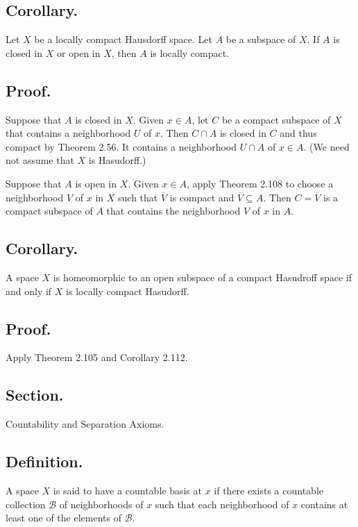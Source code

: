 \documentclass[titlepage]{article}
\begin{document}
\subsection{Corollary.} Let $X$ be a locally compact Hausdorff space. Let $A$ be a subspace of $X$. If $A$ is closed in $X$ or open in $X$, then $A$ is locally compact.

\subsection{Proof.} Suppose that $A$ is closed in $X$. Given $x \in A$, let $C$ be a compact subspace of $X$ that contains a neighborhood $U$ of $x$. Then $C \cap A$ is closed in $C$ and thus compact by Theorem 2.56. It contains a neighborhood $U \cap A$ of $x \in A$. (We need not assume that $X$ is Hasudorff.)

Suppose that $A$ is open in $X$. Given $x \in A$, apply Theorem 2.108 to choose a neighborhood $V$ of $x$ in $X$ such that $\overline{V}$ is compact and $\overline{V} \subseteq A$. Then $C = \overline{V}$ is a compact subspace of $A$ that contains the neighborhood $V$ of $x$ in $A$.

\subsection{Corollary.} A space $X$ is homeomorphic to an open subspace of a compact Hasudroff space if and only if $X$ is locally compact Hasudorff.

\subsection{Proof.} Apply Theorem 2.105 and Corollary 2.112.

\newpage {}

\subsection{Section.} Countability and Separation Axioms.

\subsection{Definition.} A space $X$ is said to have a countable basis at $x$ if there exists a countable collection $\mathcal{B}$ of neighborhoods of $x$ such that each neighborhood of $x$ contains at least one of the elements of $\mathcal{B}$.
\end{document}
